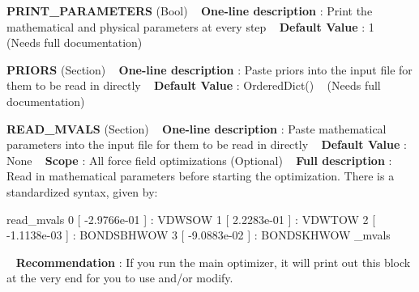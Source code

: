 \begin{DoxyItemize}
\item {\bfseries  P\+R\+I\+N\+T\+\_\+\+P\+A\+R\+A\+M\+E\+T\+E\+RS } (Bool) ~\newline
{\bfseries  One-\/line description }\+: Print the mathematical and physical parameters at every step ~\newline
{\bfseries  Default Value }\+: 1 ~\newline
(Needs full documentation)\end{DoxyItemize}
\begin{DoxyItemize}
\item {\bfseries  P\+R\+I\+O\+RS } (Section) ~\newline
{\bfseries  One-\/line description }\+: Paste priors into the input file for them to be read in directly ~\newline
{\bfseries  Default Value }\+: Ordered\+Dict() ~\newline
(Needs full documentation)\end{DoxyItemize}
\begin{DoxyItemize}
\item {\bfseries  R\+E\+A\+D\+\_\+\+M\+V\+A\+LS } (Section) ~\newline
{\bfseries  One-\/line description }\+: Paste mathematical parameters into the input file for them to be read in directly ~\newline
{\bfseries  Default Value }\+: None ~\newline
{\bfseries  Scope }\+: All force field optimizations (Optional) ~\newline
{\bfseries  Full description }\+: Read in mathematical parameters before starting the optimization. There is a standardized syntax, given by\+: \begin{DoxyVerb}read_mvals
 0 [ -2.9766e-01 ] : VDWSOW
 1 [  2.2283e-01 ] : VDWTOW
 2 [ -1.1138e-03 ] : BONDSBHWOW
 3 [ -9.0883e-02 ] : BONDSKHWOW
 \read_mvals \end{DoxyVerb}
 ~\newline
{\bfseries  Recommendation }\+: If you run the main optimizer, it will print out this block at the very end for you to use and/or modify.\end{DoxyItemize}
